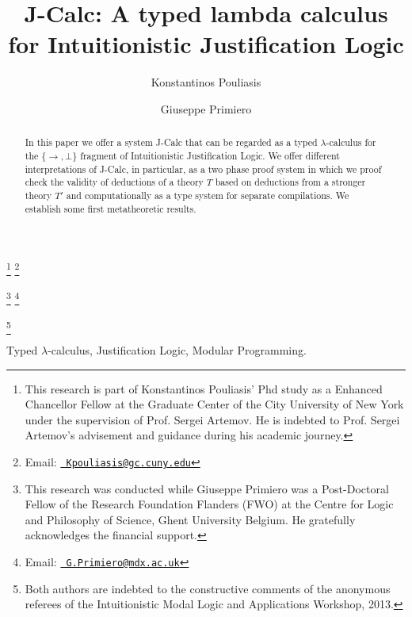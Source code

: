 \documentclass[11pt]{entcs}
\begin{document}
\begin{frontmatter}


\title{J-Calc: A typed lambda calculus for Intuitionistic Justification Logic}

\author{Konstantinos Pouliasis}
\address{Department of Computer Science\\
The Graduate Center at City University of New York, \\
NY, USA}
\thanks[K]{This research is part of Konstantinos Pouliasis' Phd study as a Enhanced Chancellor Fellow at the Graduate Center of the City University of New York under the supervision of Prof. Sergei Artemov. He is indebted to Prof. Sergei Artemov's advisement and guidance during his academic journey.} 
\thanks[email]{Email:
\href{mailto:Kpouliasis@gc.cuny.edu} 
{\texttt{\normalshape
        Kpouliasis@gc.cuny.edu}}}



\author{Giuseppe Primiero} 
\address{Department of Computer Science\\ 
Middlesex University\\
United Kingdom}



\thanks[g]{This research was conducted while Giuseppe Primiero was a Post-Doctoral Fellow of the Research Foundation Flanders (FWO) at the Centre for Logic and Philosophy of Science, Ghent University Belgium. He gratefully acknowledges the financial support.}
                \thanks[coemail]{Email:
    \href{mailto:G.Primiero@mdx.ac.uk} {\texttt{\normalshape
        G.Primiero@mdx.ac.uk}}}

\thanks[all]{Both authors are indebted to the constructive comments of the anonymous referees of the Intuitionistic Modal Logic and Applications Workshop, 2013.}

 \begin{abstract}
In this paper we offer a system J-Calc that can be regarded as a typed $\lambda$-calculus for the $\{\rightarrow, \bot\}$ fragment of Intuitionistic Justification Logic. We offer different interpretations of J-Calc, in particular, as a two phase  proof system in which we proof check the validity of deductions of a  theory $T$ based on deductions from a stronger theory $T'$ and computationally as a type system for separate compilations. We establish some first metatheoretic results.
\end{abstract}

\begin{keyword}
Typed $\lambda$-calculus, Justification Logic, Modular Programming.
\end{keyword}


\end{frontmatter}
\end{document}
